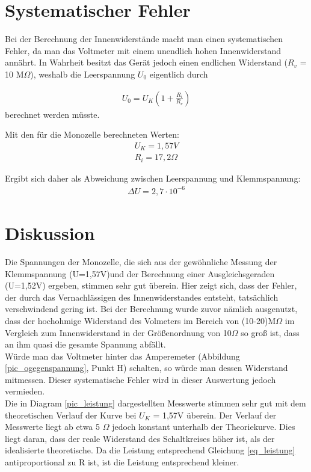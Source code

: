 \section{Systematischer Fehler}
Bei der Berechnung der Innenwiderstände macht man einen systematischen Fehler, da man das Voltmeter mit einem unendlich hohen Innenwiderstand annährt. In Wahrheit besitzt das Gerät jedoch einen endlichen Widerstand ($R_v$ = 10 M$\Omega$), weshalb die Leerspannung $U_0$ eigentlich durch

\begin{align}
U_0 = U_K \left(1 + \frac{R_i}{R_v} \right)
\end{align}
berechnet werden müsste.

Mit den für die Monozelle berechneten Werten:
\begin{align*}
U_K=1,57V\\
R_i=17,2 \Omega
\end{align*}

Ergibt sich daher als Abweichung zwischen Leerspannung und Klemmspannung:
\begin{align*}
\Delta U = 2,7\cdot 10^{-6}
\end{align*}

\section{Diskussion}
Die Spannungen der Monozelle, die sich aus der gewöhnliche Messung der Klemmspannung (U=1,57V)und der Berechnung einer Ausgleichsgeraden (U=1,52V) ergeben, stimmen sehr gut überein. Hier zeigt sich, dass der Fehler, der durch das Vernachlässigen des Innenwiderstandes entsteht, tatsächlich verschwindend gering ist. Bei der Berechnung wurde zuvor nämlich ausgenutzt, dass der hochohmige Widerstand des Volmeters im Bereich von (10-20)M$\Omega$ im Vergleich zum Innenwiderstand in der Größenordnung von 10$\Omega$ so groß ist, dass an ihm quasi die gesamte Spannung abfällt.\\

Würde man das Voltmeter hinter das Amperemeter (Abbildung \ref{pic_ogegenspannung}, Punkt H) schalten, so würde man dessen Widerstand mitmessen. Dieser systematische Fehler wird in dieser Auswertung jedoch vermieden.\\

Die in Diagram \ref{pic_leistung} dargestellten Messwerte stimmen sehr gut mit dem theoretischen Verlauf der Kurve bei $U_K$ = 1,57V überein. Der Verlauf der Messwerte liegt ab etwa 5 $\Omega$ jedoch konstant unterhalb der Theoriekurve. Dies liegt daran, dass der reale Widerstand des Schaltkreises höher ist, als der idealisierte theoretische. Da die Leistung entsprechend Gleichung \eqref{eq_leistung} antiproportional zu R ist, ist die Leistung entsprechend kleiner.\\


